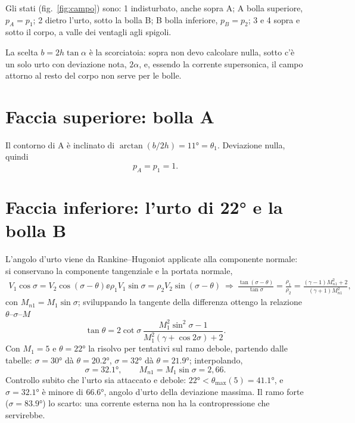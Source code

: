 
Gli stati (fig.~\ref{fig:campo}) sono: 1 indisturbato, anche sopra A; A bolla superiore, $p_A=p_1$; 2 dietro l'urto,
sotto la bolla B; B bolla inferiore, $p_B=p_2$; 3 e 4 sopra e sotto il corpo, a valle dei ventagli agli spigoli.

La scelta $b=2h\tan\alpha$ è la scorciatoia: sopra non devo calcolare nulla, sotto c'è un solo urto con deviazione
nota, $2\alpha$, e, essendo la corrente supersonica, il campo attorno al resto del corpo non serve per le bolle.

\section*{Faccia superiore: bolla A}
Il contorno di A è inclinato di $\arctan(b/2h)=\ang{11}=\theta_1$. Deviazione nulla, quindi
\[
p_A=p_1=1 .
\]

\section*{Faccia inferiore: l'urto di 22° e la bolla B}
L'angolo d'urto viene da Rankine--Hugoniot applicate alla componente normale: si conservano la componente
tangenziale e la portata normale,
\begin{gather*}
V_1\cos\sigma=V_2\cos(\sigma-\theta) \ee \rho_1V_1\sin\sigma=\rho_2V_2\sin(\sigma-\theta)
\ \Rightarrow\ \frac{\tan(\sigma-\theta)}{\tan\sigma}=\frac{\rho_1}{\rho_2}=\frac{(\gamma-1)M_{n1}^2+2}{(\gamma+1)M_{n1}^2},
\end{gather*}
con $M_{n1}=M_1\sin\sigma$; sviluppando la tangente della differenza ottengo la relazione $\theta$--$\sigma$--$M$
\[
\tan\theta=2\cot\sigma\,\frac{M_1^2\sin^2\sigma-1}{M_1^2(\gamma+\cos2\sigma)+2}.
\]
Con $M_1=5$ e $\theta=\ang{22}$ la risolvo per tentativi sul ramo debole, partendo dalle tabelle: $\sigma=\ang{30}$
dà $\theta=\ang{20.2}$, $\sigma=\ang{32}$ dà $\theta=\ang{21.9}$; interpolando,
\[
\sigma=\ang{32.1},\qquad M_{n1}=M_1\sin\sigma=2{,}66 .
\]
Controllo subito che l'urto sia attaccato e debole: $\ang{22}<\theta_{\max}(5)=\ang{41.1}$, e $\sigma=\ang{32.1}$ è
minore di \ang{66.6}, angolo d'urto della deviazione massima. Il ramo forte ($\sigma=\ang{83.9}$) lo scarto: una
corrente esterna non ha la contropressione che servirebbe.

